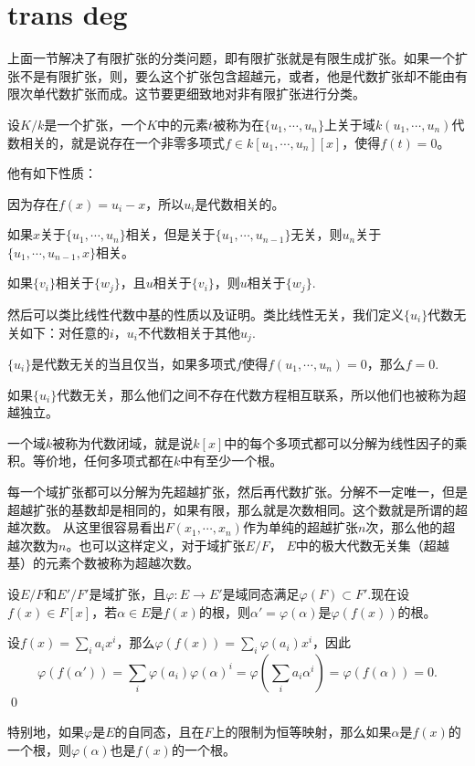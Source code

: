 \section{trans deg}
上面一节解决了有限扩张的分类问题，即有限扩张就是有限生成扩张。如果一个扩张不是有限扩张，则，要么这个扩张包含超越元，或者，他是代数扩张却不能由有限次单代数扩张而成。这节要更细致地对非有限扩张进行分类。


\para 设$K/k$是一个扩张，一个$K$中的元素$t$被称为在$\{u_1,\cdots ,u_n\}$上关于域$k(u_1,\cdots ,u_n)$代数相关的，就是说存在一个非零多项式$f\in k[u_1,\cdots ,u_n][x]$，使得$f(t)=0$。

他有如下性质：

 因为存在$f(x)=u_i-x$，所以$u_i$是代数相关的。

 如果$x$关于$\{u_1,\cdots ,u_n\}$相关，但是关于$\{u_1,\cdots ,u_{n-1}\}$无关，则$u_n$关于$\{u_1,\cdots ,u_{n-1},x\}$相关。

 如果$\{v_i\}$相关于$\{w_j\}$，且$u$相关于$\{v_i\}$，则$u$相关于$\{w_j\}$.

然后可以类比线性代数中基的性质以及证明。类比线性无关，我们定义$\{u_i\}$代数无关如下：对任意的$i$，$u_i$不代数相关于其他$u_j$.

\pro $\{u_i\}$是代数无关的当且仅当，如果多项式$f$使得$f(u_1,\cdots ,u_n)=0$，那么$f=0$.

如果$\{u_i\}$代数无关，那么他们之间不存在代数方程相互联系，所以他们也被称为超越独立。

\para 一个域$k$被称为代数闭域，就是说$k[x]$中的每个多项式都可以分解为线性因子的乘积。等价地，任何多项式都在$k$中有至少一个根。

每一个域扩张都可以分解为先超越扩张，然后再代数扩张。分解不一定唯一，但是超越扩张的基数却是相同的，如果有限，那么就是次数相同。这个数就是所谓的超越次数。 从这里很容易看出$F(x_1,\cdots ,x_n)$作为单纯的超越扩张$n$次，那么他的超越次数为$n$。也可以这样定义，对于域扩张$E/F$， $E$中的极大代数无关集（超越基）的元素个数被称为超越次数。

\lem 设$E/F$和$E'/F'$是域扩张，且$\varphi:E\to E'$是域同态满足$\varphi(F)\subset F'$.现在设$f(x)\in F[x]$，若$\alpha\in E$是$f(x)$的根，则$\alpha'=\varphi(\alpha)$是$\varphi(f(x))$的根。

\proof 设$f(x)=\sum_i a_i x^i$，那么$\varphi(f(x))=\sum_i \varphi(a_i) x^i$，因此
\[
	\varphi(f(\alpha'))=\sum_i \varphi(a_i) \varphi(\alpha)^i=\varphi\left(\sum_i a_i\alpha^i\right)=\varphi\left(f(\alpha)\right)=0.
\]\qed

特别地，如果$\varphi$是$E$的自同态，且在$F$上的限制为恒等映射，那么如果$\alpha$是$f(x)$的一个根，则$\varphi(\alpha)$也是$f(x)$的一个根。

